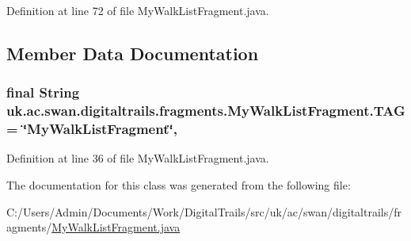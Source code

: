 Definition at line 72 of file My\+Walk\+List\+Fragment.\+java.



\subsection{Member Data Documentation}
\hypertarget{classuk_1_1ac_1_1swan_1_1digitaltrails_1_1fragments_1_1_my_walk_list_fragment_aba9cd5cc2bc22c63bca7f52bab9b06db}{
\subsubsection[{T\+A\+G}]{\setlength{\rightskip}{0pt plus 5cm}final String uk.\+ac.\+swan.\+digitaltrails.\+fragments.\+My\+Walk\+List\+Fragment.\+T\+A\+G = \char`\"{}My\+Walk\+List\+Fragment\char`\"{}\hspace{0.3cm}{\ttfamily [static]}, {\ttfamily [private]}}}\label{classuk_1_1ac_1_1swan_1_1digitaltrails_1_1fragments_1_1_my_walk_list_fragment_aba9cd5cc2bc22c63bca7f52bab9b06db}


Definition at line 36 of file My\+Walk\+List\+Fragment.\+java.



The documentation for this class was generated from the following file\+:\begin{DoxyCompactItemize}
\item 
C\+:/\+Users/\+Admin/\+Documents/\+Work/\+Digital\+Trails/src/uk/ac/swan/digitaltrails/fragments/\hyperlink{_my_walk_list_fragment_8java}{My\+Walk\+List\+Fragment.\+java}\end{DoxyCompactItemize}
